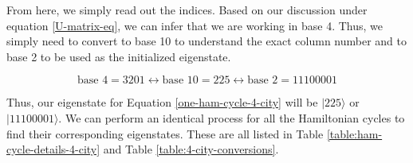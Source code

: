 \documentclass[msc,oneside]{ubcthesis}
\begin{document}
	From here, we simply read out the indices. Based on our discussion under equation \ref{U-matrix-eq}, we can infer that we are working in base 4. Thus, we simply need to convert to base 10 to understand the exact column number and to base 2 to be used as the initialized eigenstate.
	
	\begin{equation*}
		\text{base } 4 = 3201 \leftrightarrow \text{base } 10 = 225 \leftrightarrow  \text{base } 2 = 11100001
	\end{equation*}
	

Thus, our eigenstate for Equation \ref{one-ham-cycle-4-city} will be $|225\rangle$ or $|11100001\rangle$. We can perform an identical process for all the Hamiltonian cycles to find their corresponding eigenstates. These are all listed in Table \ref{table:ham-cycle-details-4-city} and Table \ref{table:4-city-conversions}.
	
\end{document}
